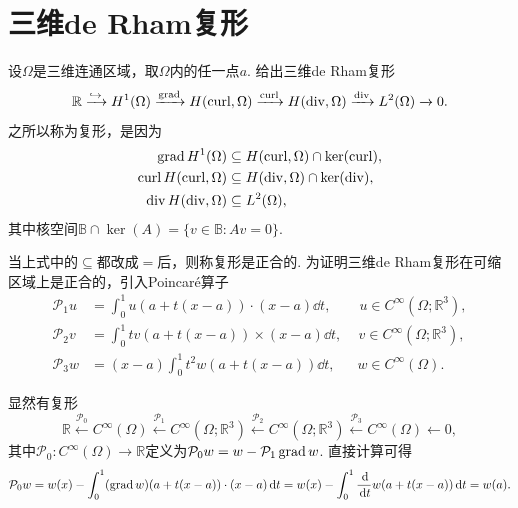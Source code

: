 \section{三维de Rham复形}

设$\Omega$是三维连通区域，取$\Omega$内的任一点$a$. 给出三维de Rham复形
\begin{equation}\label{eq:deRhamcomplex3d}
\mathbb R\xrightarrow{\hookrightarrow} H^1(\Omega)\xrightarrow{\operatorname{grad}} H(\operatorname{curl}, \Omega)\xrightarrow{\operatorname{curl}} H(\operatorname{div}, \Omega) \xrightarrow{\operatorname{div}} L^2(\Omega)\xrightarrow{}0.
\end{equation}
之所以称为复形，是因为
\begin{align*}    
\operatorname{grad} H^1(\Omega)&\subseteq H(\operatorname{curl}, \Omega)\cap\ker(\operatorname{curl}), \\
\operatorname{curl} H(\operatorname{curl}, \Omega)&\subseteq H(\operatorname{div}, \Omega)\cap\ker(\operatorname{div}), \\
\operatorname{div} H(\operatorname{div}, \Omega) &\subseteq L^2(\Omega),
\end{align*}
其中核空间$\mathbb B\cap\ker(A)=\{v\in \mathbb B : Av=0\}$.

当上式中的$\subseteq$都改成$=$后，则称复形是正合的. 为证明三维de Rham复形在可缩区域上是正合的，引入Poincar\'e算子
\cite{GopalakrishnanDemkowicz2004,Hiptmair1999,ChristiansenHuSande2020}
\begin{align}
\label{poincareopP1}
\mathcal{P}_1u &= \int_0^1u(a+t(x-a))\cdot (x-a)\dd t, \quad\quad u\in C^{\infty}(\Omega;\mathbb R^3), \\
\label{poincareopP2}
\mathcal{P}_2v &= \int_0^1tv(a+t(x-a))\times (x-a)\dd t, \quad \, v\in C^{\infty}(\Omega;\mathbb R^3), \\
\label{poincareopP3}
\mathcal{P}_3w &= (x-a)\int_0^1t^2w(a+t(x-a))\dd t, \quad\;\; w\in C^{\infty}(\Omega).
\end{align}


显然有复形
\begin{equation}\label{eq:deRhamcomplexSmooth3d}
\mathbb R\xleftarrow{\mathcal{P}_0} C^{\infty}(\Omega) \xleftarrow{\mathcal{P}_1} C^{\infty}(\Omega;\mathbb R^3)\xleftarrow{\mathcal{P}_2} C^{\infty}(\Omega;\mathbb R^3) \xleftarrow{\mathcal{P}_3} C^{\infty}(\Omega)\xleftarrow{}0,
\end{equation}
其中$\mathcal{P}_0: C^{\infty}(\Omega)\to\mathbb R$定义为$\mathcal{P}_0w=w-\mathcal{P}_1\operatorname{grad} w$. 直接计算可得
\begin{align*}
\mathcal{P}_0w=w(x)-\int_0^1(\operatorname{grad} w)(a+t(x-a))\cdot (x-a)\,{\rm d} t=w(x)-\int_0^1\frac{\,{\rm d}}{\,{\rm d} t}w(a+t(x-a))\,{\rm d} t=w(a).
\end{align*}

